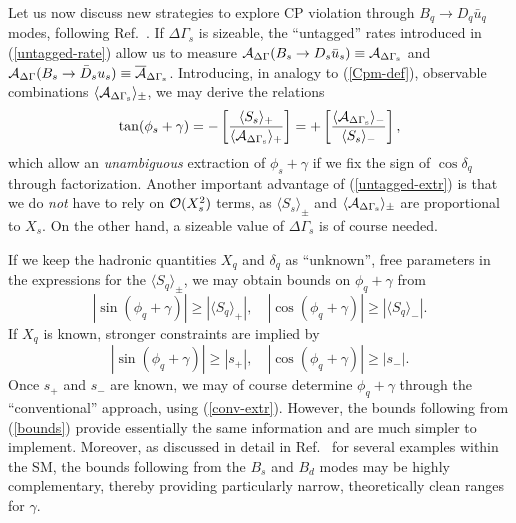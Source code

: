 \documentclass[11pt]{cernrep}
\begin{document}
Let us now discuss new strategies to explore CP violation through 
$B_q\to D_q \bar u_q$ modes, following Ref.~\cite{RF-gam-ca}. 
If $\Delta\Gamma_s$ is sizeable, the ``untagged'' 
rates introduced in (\ref{untagged-rate}) allow us to measure 
${\cal A}_{\rm \Delta\Gamma}(B_s\to D_s\bar u_s)
\equiv {\cal A}_{\rm \Delta\Gamma_s}$ and 
${\cal A}_{\rm \Delta\Gamma}(B_s\to \bar D_s u_s)\equiv 
\overline{{\cal A}}_{\rm \Delta\Gamma_s}$. Introducing, in analogy 
to (\ref{Cpm-def}), observable combinations 
$\langle{\cal A}_{\rm \Delta\Gamma_s}\rangle_\pm$, we may derive the relations
\begin{equation}\label{untagged-extr}
\tan(\phi_s+\gamma)=
-\left[\frac{\langle S_s\rangle_+}{\langle{\cal A}_{\rm \Delta\Gamma_s}
\rangle_+}\right]
=+\left[\frac{\langle{\cal A}_{\rm \Delta\Gamma_s}
\rangle_-}{\langle S_s\rangle_-}\right],
\end{equation}
which allow an {\it unambiguous} extraction of $\phi_s+\gamma$ if we fix
the sign of $\cos\delta_q$ through factorization. 
Another important advantage 
of (\ref{untagged-extr}) is that we do {\it not} have to rely on 
${\cal O}(X_s^2)$ terms, as $\langle S_s\rangle_\pm$ and 
$\langle {\cal A}_{\rm \Delta\Gamma_s}\rangle_\pm$ are proportional to $X_s$.
On the other hand, a sizeable value of $\Delta\Gamma_s$ is of course
needed.

If we keep the hadronic quantities $X_q$ and $\delta_q$  
as ``unknown'', free parameters in the expressions for the
$\langle S_q\rangle_\pm$, we may obtain bounds on $\phi_q+\gamma$ from
\begin{equation}
|\sin(\phi_q+\gamma)|\geq|\langle S_q\rangle_+|, \quad
|\cos(\phi_q+\gamma)|\geq|\langle S_q\rangle_-|.
\end{equation}
If $X_q$ is known, stronger constraints are implied by 
\begin{equation}\label{bounds}
|\sin(\phi_q+\gamma)|\geq|s_+|, \quad
|\cos(\phi_q+\gamma)|\geq|s_-|.
\end{equation}
Once $s_+$ and $s_-$ are known, we may of course determine
$\phi_q+\gamma$ through the ``conventional'' approach, using 
(\ref{conv-extr}). However, the bounds following from 
(\ref{bounds}) provide essentially the same information 
and are much simpler to 
implement. Moreover, as discussed in detail in Ref.~\cite{RF-gam-ca}
for several examples within the SM, the bounds following from the $B_s$ and 
$B_d$ modes may be highly complementary, thereby providing particularly 
narrow, theoretically clean ranges for $\gamma$. 
\end{document}
